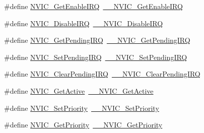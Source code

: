 \begin{DoxyCompactItemize}
\item 
\#define \hyperlink{group___c_m_s_i_s___core___n_v_i_c_functions_ga857de13232ec65dd15087eaa15bc4a69}{N\+V\+I\+C\+\_\+\+Get\+Enable\+I\+RQ}~\hyperlink{group___c_m_s_i_s___core___n_v_i_c_functions_gaaeb5e7cc0eaad4e2817272e7bf742083}{\+\_\+\+\_\+\+N\+V\+I\+C\+\_\+\+Get\+Enable\+I\+RQ}
\item 
\#define \hyperlink{group___c_m_s_i_s___core___n_v_i_c_functions_ga73b4e251f59cab4e9a5e234aac02ae57}{N\+V\+I\+C\+\_\+\+Disable\+I\+RQ}~\hyperlink{group___c_m_s_i_s___core___n_v_i_c_functions_gae016e4c1986312044ee768806537d52f}{\+\_\+\+\_\+\+N\+V\+I\+C\+\_\+\+Disable\+I\+RQ}
\item 
\#define \hyperlink{group___c_m_s_i_s___core___n_v_i_c_functions_gac608957a239466e9e0cbc30aa64feb3b}{N\+V\+I\+C\+\_\+\+Get\+Pending\+I\+RQ}~\hyperlink{group___c_m_s_i_s___core___n_v_i_c_functions_ga5a92ca5fa801ad7adb92be7257ab9694}{\+\_\+\+\_\+\+N\+V\+I\+C\+\_\+\+Get\+Pending\+I\+RQ}
\item 
\#define \hyperlink{group___c_m_s_i_s___core___n_v_i_c_functions_ga2b47e2e52cf5c48a5c3348636434b3ac}{N\+V\+I\+C\+\_\+\+Set\+Pending\+I\+RQ}~\hyperlink{group___c_m_s_i_s___core___n_v_i_c_functions_gaabefdd4b790b9a7308929938c0c1e1ad}{\+\_\+\+\_\+\+N\+V\+I\+C\+\_\+\+Set\+Pending\+I\+RQ}
\item 
\#define \hyperlink{group___c_m_s_i_s___core___n_v_i_c_functions_ga590cf113000a079b1f0ea3dcd5b5316c}{N\+V\+I\+C\+\_\+\+Clear\+Pending\+I\+RQ}~\hyperlink{group___c_m_s_i_s___core___n_v_i_c_functions_ga562a86dbdf14827d0fee8fdafb04d191}{\+\_\+\+\_\+\+N\+V\+I\+C\+\_\+\+Clear\+Pending\+I\+RQ}
\item 
\#define \hyperlink{group___c_m_s_i_s___core___n_v_i_c_functions_ga58ad3f352f832235ab3b192ff4745320}{N\+V\+I\+C\+\_\+\+Get\+Active}~\hyperlink{group___c_m_s_i_s___core___n_v_i_c_functions_gaa2837003c28c45abf193fe5e8d27f593}{\+\_\+\+\_\+\+N\+V\+I\+C\+\_\+\+Get\+Active}
\item 
\#define \hyperlink{group___c_m_s_i_s___core___n_v_i_c_functions_gae0e9d0e2f7b6133828c71b57d4941c35}{N\+V\+I\+C\+\_\+\+Set\+Priority}~\hyperlink{group___c_m_s_i_s___core___n_v_i_c_functions_ga505338e23563a9c074910fb14e7d45fd}{\+\_\+\+\_\+\+N\+V\+I\+C\+\_\+\+Set\+Priority}
\item 
\#define \hyperlink{group___c_m_s_i_s___core___n_v_i_c_functions_gaf59b9d0a791d2157abb319753953eceb}{N\+V\+I\+C\+\_\+\+Get\+Priority}~\hyperlink{group___c_m_s_i_s___core___n_v_i_c_functions_gaeb9dc99c8e7700668813144261b0bc73}{\+\_\+\+\_\+\+N\+V\+I\+C\+\_\+\+Get\+Priority}

\end{DoxyCompactItemize}
